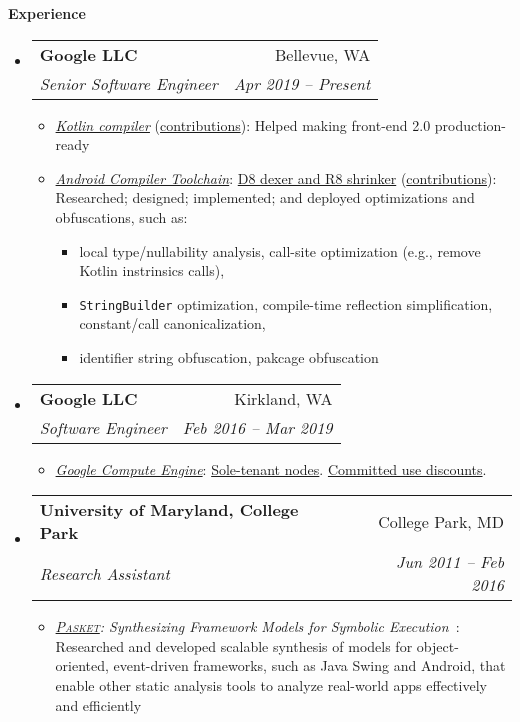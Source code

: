 \documentclass[letterpaper,11pt]{article}
\makeatletter
\newcommand{\resheading}[1]{{\large \colorbox{mygrey}{\begin{minipage}{\textwidth}{\textbf{#1 \vphantom{p\^{E}}}}\end{minipage}}}}
\newcommand{\ressubheading}[4]{
\begin{tabular*}{6.5in}{l@{\extracolsep{\fill}}r}
    \textbf{#1} & #2 \\
    \textit{#3} & \textit{#4} \\
\end{tabular*}\vspace{-6pt}}
\makeatother
\begin{document}
\resheading{Experience}
  \begin{itemize}
    \item
      \ressubheading{{Google LLC}}{Bellevue, WA}{Senior Software Engineer}{Apr 2019 -- Present}
        {
\small
        \begin{itemize}
\item\emph{\href{https://github.com/JetBrains/kotlin}{Kotlin compiler}} (\href{https://github.com/JetBrains/kotlin/commits?author=jsjeon}{contributions}):
Helped making front-end 2.0 production-ready
\item\emph{\href{https://developer.android.com/studio/preview/index.html}{Android Compiler Toolchain}}:
\href{https://r8.googlesource.com/r8}{D8 dexer and R8 shrinker} (\href{https://r8-review.googlesource.com/q/author:jsjeon+status:merged}{contributions}):
Researched; designed; implemented; and deployed optimizations and obfuscations, such as:
\begin{itemize}
\item local type/nullability analysis, call-site optimization (e.g., remove Kotlin instrinsics calls),
\item \texttt{StringBuilder} optimization, compile-time reflection simplification, constant/call canonicalization,
\item identifier string obfuscation, pakcage obfuscation
\end{itemize}
        \end{itemize}
        }
    \item
      \ressubheading{{Google LLC}}{Kirkland, WA}{Software Engineer}{Feb 2016 -- Mar 2019}
        {
\small
        \begin{itemize}
\item\emph{\href{https://cloud.google.com/compute/}{Google Compute Engine}}:
\href{https://cloudplatform.googleblog.com/2018/06/Introducing-sole-tenant-nodes-for-Google-Compute-Engine.html}{Sole-tenant nodes}.
\href{https://cloudplatform.googleblog.com/2017/09/committed-use-discounts-for-Google-Compute-Engine-now-generally-available.html}{Committed use discounts}.
        \end{itemize}
        }
    \item
      \ressubheading{{University of Maryland, College Park}}{College Park, MD}{Research Assistant}{Jun 2011 -- Feb 2016}
        {
\small
        \begin{itemize}
\item\emph{\href{https://github.com/plum-umd/pasket}{\textsc{Pasket}}: Synthesizing Framework Models for Symbolic Execution}~\cite{FMSD17, icse16, fse15, cav15}: %
Researched and developed scalable synthesis of models for object-oriented,
event-driven frameworks, such as Java Swing and Android,
that enable other static analysis tools
to analyze real-world apps effectively and efficiently


\end{itemize}}
\end{itemize}
\end{document}
